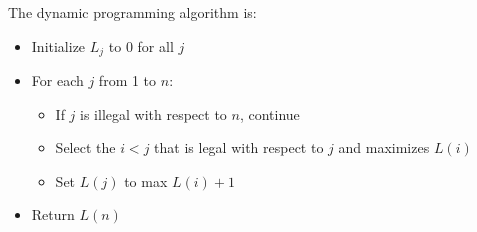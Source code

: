 \documentclass[letterpaper, 11pt]{article}
\begin{document}
\begin{enumerate}
\begin{enumerate}
        The dynamic programming algorithm is:
        \begin{itemize}
            \item Initialize $L_j$ to 0 for all $j$
            \item For each $j$ from 1 to $n$:
            \begin{itemize}
                \item If $j$ is illegal with respect to $n$, continue
                \item Select the $i < j$ that is legal with respect to $j$ and maximizes $L(i)$
                \item Set $L(j)$ to max $L(i) + 1$
            \end{itemize}
            \item Return $L(n)$
        \end{itemize}
    \end{enumerate}
    
\end{enumerate}
\end{document}

